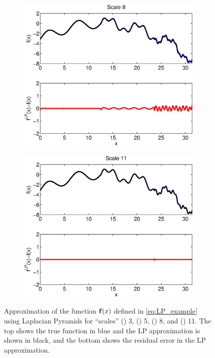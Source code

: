\begin{figure}[t]
\begin{subfigure}{0.22\textwidth}
\includegraphics[width=\textwidth]{Scale8_S2}
\caption{}
\label{subfig:LP_ex3}
\end{subfigure}
\begin{subfigure}{0.22\textwidth}
\includegraphics[width=\textwidth]{Scale11_S2}
\caption{}
\label{subfig:LP_ex4}
\end{subfigure}
\caption[Function approximation using Laplacian Pyramids at different scales]{Approximation of the function $\mathbf{f}(x)$ defined in \eqref{eq:LP_example} using Laplacian Pyramids for ``scales'' () 3, () 5, () 8, and () 11. The top shows the true function in blue and the LP approximation is shown in black, and the bottom shows the residual error in the LP approximation.}
\label{fig:LP_ex}
\end{figure}

